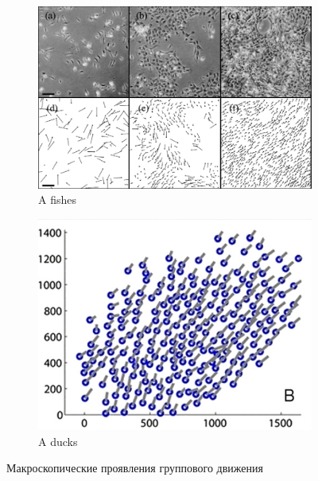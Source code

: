     \begin{figure}
    	\centering
        \begin{subfigure}{0.4\textwidth}
                \includegraphics[width=\textwidth]{Fig17_CollectiveMotion}
                \caption{A fishes}
                \label{fig:CollMot:fishes}
        \end{subfigure}
        \begin{subfigure}{0.4\textwidth}
                \includegraphics[width=\textwidth]{Fig29_CollectiveMotion_part}
                \caption{A ducks}
                \label{fig:CollMot:ducks}
        \end{subfigure}
        \caption{Макроскопические проявления группового движения}\label{fig:CollMot:macroscopic}
	\end{figure}

